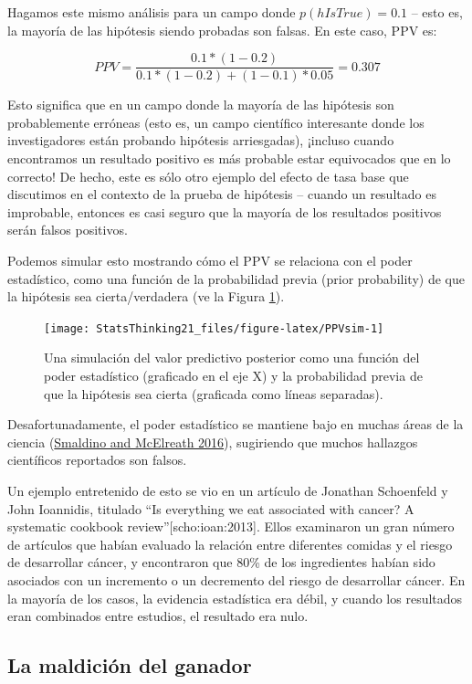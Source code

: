 \documentclass[
  12pt,
]{book}
\begin{document}
Hagamos este mismo análisis para un campo donde \(p(hIsTrue)=0.1\) -- esto es, la mayoría de las hipótesis siendo probadas son falsas. En este caso, PPV es:

\[
PPV = \frac{0.1 * (1 - 0.2)}{0.1 * (1 - 0.2) + (1 - 0.1) * 0.05} = 0.307
\]

Esto significa que en un campo donde la mayoría de las hipótesis son probablemente erróneas (esto es, un campo científico interesante donde los investigadores están probando hipótesis arriesgadas), ¡incluso cuando encontramos un resultado positivo es más probable estar equivocados que en lo correcto! De hecho, este es sólo otro ejemplo del efecto de tasa base que discutimos en el contexto de la prueba de hipótesis -- cuando un resultado es improbable, entonces es casi seguro que la mayoría de los resultados positivos serán falsos positivos.

Podemos simular esto mostrando cómo el PPV se relaciona con el poder estadístico, como una función de la probabilidad previa (prior probability) de que la hipótesis sea cierta/verdadera (ve la Figura \ref{fig:PPVsim}).

\begin{figure}
\texttt{[image: StatsThinking21\_files/figure-latex/PPVsim-1]} \caption{Una simulación del valor predictivo posterior como una función del poder estadístico (graficado en el eje X) y la probabilidad previa de que la hipótesis sea cierta (graficada como líneas separadas).}\label{fig:PPVsim}
\end{figure}

Desafortunadamente, el poder estadístico se mantiene bajo en muchas áreas de la ciencia (\protect\hyperlink{ref-smal:mcel:2016}{Smaldino and McElreath 2016}), sugiriendo que muchos hallazgos científicos reportados son falsos.

Un ejemplo entretenido de esto se vio en un artículo de Jonathan Schoenfeld y John Ioannidis, titulado ``Is everything we eat associated with cancer? A systematic cookbook review''{[}scho:ioan:2013{]}. Ellos examinaron un gran número de artículos que habían evaluado la relación entre diferentes comidas y el riesgo de desarrollar cáncer, y encontraron que 80\% de los ingredientes habían sido asociados con un incremento o un decremento del riesgo de desarrollar cáncer. En la mayoría de los casos, la evidencia estadística era débil, y cuando los resultados eran combinados entre estudios, el resultado era nulo.

\hypertarget{la-maldiciuxf3n-del-ganador}{%
\subsection{La maldición del ganador}\label{la-maldiciuxf3n-del-ganador}}
\end{document}
